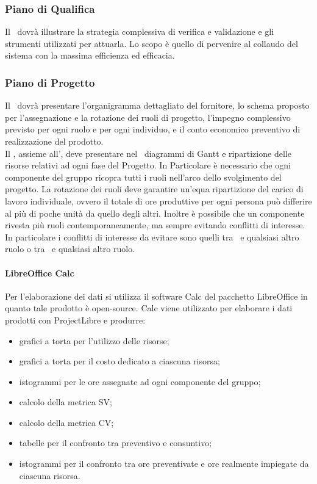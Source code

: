 \documentclass[12pt,a4paper]{article}
\begin{document}
\subsubsection{Piano di Qualifica}
Il \PdQ\ dovrà illustrare la strategia complessiva di verifica e validazione e gli strumenti utilizzati per attuarla. Lo scopo è quello di pervenire al collaudo del sistema con la massima efficienza ed efficacia.

\subsubsection{Piano di Progetto} %
Il \PdP\ dovrà presentare l'organigramma dettagliato del fornitore, lo schema proposto per l'assegnazione e la rotazione dei ruoli di progetto, l'impegno complessivo previsto per ogni ruolo e per ogni individuo, e il conto economico preventivo di realizzazione del prodotto.\\
Il \PM, assieme all'\AM, deve presentare nel \PdP\ diagrammi di Gantt e ripartizione delle risorse relativi ad ogni fase del Progetto. In Particolare è necessario che ogni componente del gruppo ricopra tutti i ruoli nell'arco dello svolgimento del progetto. La rotazione dei ruoli deve garantire un'equa ripartizione del carico di lavoro individuale, ovvero il totale di ore produttive per ogni persona può differire al più di poche unità da quello degli altri. Inoltre è possibile che un componente rivesta più ruoli contemporaneamente, ma sempre evitando conflitti di interesse. In particolare i conflitti di interesse da evitare sono quelli tra \PM\ e qualsiasi altro ruolo o tra \VR\ e qualsiasi altro ruolo.


\paragraph{LibreOffice Calc}
Per l’elaborazione dei dati si utilizza il software Calc del pacchetto LibreOffice in quanto tale prodotto è open-source. Calc viene utilizzato per elaborare i dati prodotti con ProjectLibre e produrre:
\begin{itemize}
	\item grafici a torta per l’utilizzo delle risorse;
	\item grafici a torta per il costo dedicato a ciascuna risorsa;
	\item istogrammi per le ore assegnate ad ogni componente del gruppo;
	\item calcolo della metrica SV;
	\item calcolo della metrica CV;
	\item tabelle per il confronto tra preventivo e consuntivo;
	\item istogrammi per il confronto tra ore preventivate e ore realmente impiegate da
	ciascuna risorsa.
\end{itemize}
\end{document}
